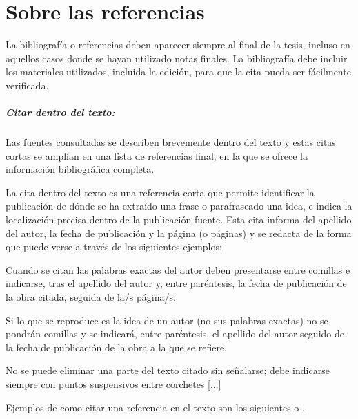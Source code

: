 \chapter{Sobre las referencias}

La bibliografía o referencias deben aparecer siempre al final de la tesis, incluso en aquellos casos donde se hayan utilizado notas finales. La bibliografía debe incluir los materiales utilizados, incluida la edición, para que la cita pueda ser fácilmente verificada. 

\paragraph{Citar dentro del texto:}

Las fuentes consultadas se describen brevemente dentro del texto y estas citas cortas se amplían en una lista de referencias final, en la que se ofrece la información bibliográfica completa. 

La cita dentro del texto es una referencia corta que permite identificar la publicación de dónde se ha extraído una frase o parafraseado una idea, e indica la localización precisa dentro de la publicación fuente. Esta cita informa del apellido del autor, la fecha de publicación y la página (o páginas) y se redacta de la forma que puede verse a través de los siguientes ejemplos:

Cuando se citan las palabras exactas del autor deben presentarse entre comillas e indicarse, tras el apellido del autor y, entre paréntesis, la fecha de publicación de la obra citada, seguida de la/s página/s.

Si lo que se reproduce es la idea de un autor (no sus palabras exactas) no se pondrán comillas y se indicará, entre paréntesis, el apellido del autor seguido de la fecha de publicación de la obra a la que se refiere.

No se puede eliminar una parte del texto citado sin señalarse; debe indicarse siempre con puntos suspensivos entre corchetes [...]

Ejemplos de como citar una referencia en el texto son los siguientes \cite{Ashtiani2014} o \cite{Ashtiani2014,Mateos2009,Vicente2016}.

